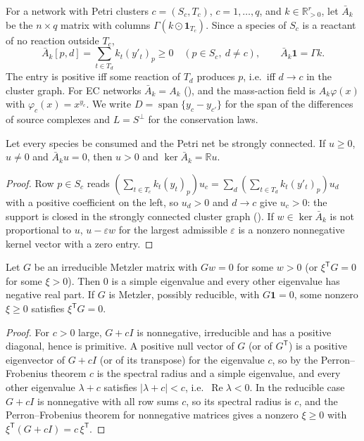 \documentclass[11pt,a4paper]{report}
\newcommand{\spn}{\operatorname{span}}
\newcommand{\Rp}{\mathbb{R}_{>0}}
\newcommand{\tp}{^{\mathsf T}}
\begin{document}
For a network with Petri clusters \(c=(S_c,T_c)\), \(c=1,\dots,q\), and \(k\in\Rp^r\), let \(\bar A_k\) be the
\(n\times q\) matrix with columns \(\Gamma(k\odot\mathbf 1_{T_c})\). Since a species of \(S_c\) is a reactant of no
reaction outside \(T_c\),
\begin{equation}\label{eq:Z}
\bar A_k[p,d]=\textstyle\sum_{t\in T_d}k_t(y'_t)_p\ge0\quad(p\in S_c,\ d\neq c),\qquad \bar A_k\mathbf 1=\Gamma k .
\end{equation}
The entry is positive iff some reaction of \(T_d\) produces \(p\), i.e.\ iff \(d\to c\) in the cluster graph. For EC
networks \(\bar A_k=A_k\) (), and the mass-action field is \(A_k\varphi(x)\) with
\(\varphi_c(x)=x^{y_c}\). We write \(D=\spn\{y_c-y_{c'}\}\) for the span of the differences of source complexes and
\(L=S^\perp\) for the conservation laws.

\begin{lemma}[agents P, Q3]\label{lem:CFprime}
Let every species be consumed and the Petri net be strongly connected. If \(u\ge0\), \(u\ne0\) and \(\bar A_ku=0\),
then \(u>0\) and \(\ker\bar A_k=\mathbb{R}u\).
\end{lemma}
\begin{proof}
Row \(p\in S_c\) reads \((\sum_{t\in T_c}k_t(y_t)_p)u_c=\sum_d(\sum_{t\in T_d}k_t(y'_t)_p)u_d\) with a positive
coefficient on the left, so \(u_d>0\) and \(d\to c\) give \(u_c>0\): the support is closed in the strongly connected
cluster graph (). If \(w\in\ker\bar A_k\) is not proportional to \(u\), \(u-\varepsilon w\) for the
largest admissible \(\varepsilon\) is a nonzero nonnegative kernel vector with a zero entry.
\end{proof}

\begin{lemma}\label{lem:M}
Let \(G\) be an irreducible Metzler matrix with \(Gw=0\) for some \(w>0\) (or \(\xi\tp G=0\) for some \(\xi>0\)). Then
\(0\) is a simple eigenvalue and every other eigenvalue has negative real part. If \(G\) is Metzler, possibly
reducible, with \(G\mathbf 1=0\), some nonzero \(\xi\ge0\) satisfies \(\xi\tp G=0\).
\end{lemma}
\begin{proof}
For \(c>0\) large, \(G+cI\) is nonnegative, irreducible and has a positive diagonal, hence is primitive. A positive null
vector of \(G\) (or of \(G\tp\)) is a positive eigenvector of \(G+cI\) (or of its transpose) for the eigenvalue \(c\), so
by the Perron--Frobenius theorem \(c\) is the spectral radius and a simple eigenvalue, and every other eigenvalue
\(\lambda+c\) satisfies \(|\lambda+c|<c\), i.e.\ \(\operatorname{Re}\lambda<0\). In the reducible case \(G+cI\) is
nonnegative with all row sums \(c\), so its spectral radius is \(c\), and the Perron--Frobenius theorem for nonnegative
matrices gives a nonzero \(\xi\ge0\) with \(\xi\tp(G+cI)=c\,\xi\tp\).
\end{proof}
\end{document}
